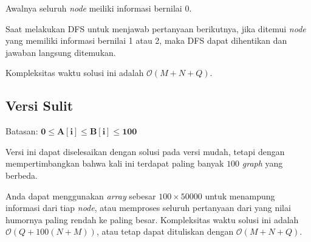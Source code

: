 \documentclass[../main_editorial.tex]{subfiles} %
\newcommand{\tnode}{\textit{node}\xspace}
\newcommand{\bigO}[1]{\mathcal{O}(#1)} %
\begin{document}
Awalnya seluruh \tnode meiliki informasi bernilai 0.

Saat melakukan DFS untuk menjawab pertanyaan berikutnya, jika ditemui \tnode yang memiliki informasi bernilai 1 atau 2, maka DFS dapat dihentikan dan jawaban langsung ditemukan.

Kompleksitas waktu solusi ini adalah $\bigO{M + N + Q}$.

\subsection*{Versi Sulit}

Batasan: $\mathbf{0 \le A[i] \le B[i] \le 100}$

Versi ini dapat diselesaikan dengan solusi pada versi mudah, tetapi dengan mempertimbangkan bahwa kali ini terdapat paling banyak $100$ \textit{graph} yang berbeda.

Anda dapat menggunakan \textit{array} sebesar $100 \times 50000$ untuk menampung informasi dari tiap \tnode, atau memproses seluruh pertanyaan dari yang nilai humornya paling rendah ke paling besar. Kompleksitas waktu solusi ini adalah $\bigO{Q + 100(N + M)}$, atau tetap dapat dituliskan dengan $\bigO{M + N + Q}$.
\end{document}
